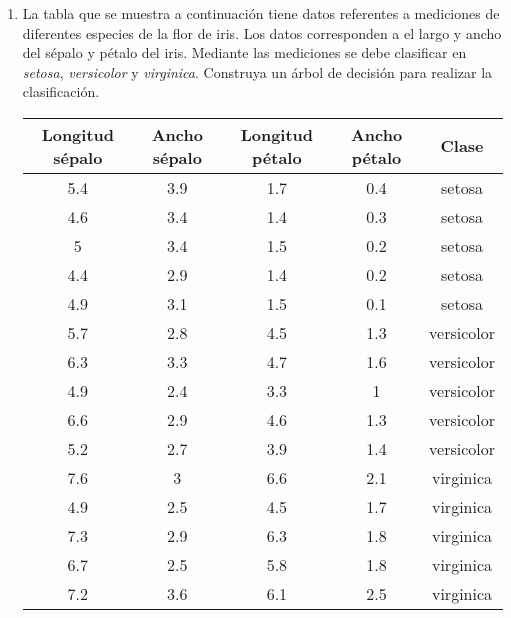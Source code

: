 \documentclass[
10pt, %
a4paper, %
]{article}
\begin{document}
\begin{enumerate}
    \item La tabla que se muestra a continuación tiene datos referentes a mediciones de diferentes especies de la flor de 
    iris\cite{scikit-learn}. Los datos corresponden a el largo y ancho del sépalo y pétalo del iris. Mediante las mediciones se debe
	clasificar en \textit{setosa}, \textit{versicolor} y \textit{virginica}. Construya un árbol de decisión para realizar
	la clasificación.
         \begin{table}[H]
                 \centering
                 \begin{tabular}{ccccc}
                         \toprule
                         Longitud sépalo & Ancho sépalo & Longitud pétalo & Ancho pétalo & Clase \\ \midrule
                         5.4 & 3.9 & 1.7 & 0.4 & setosa \\
                         4.6 & 3.4 & 1.4 & 0.3 & setosa \\
                         5   & 3.4 & 1.5 & 0.2 & setosa \\
                         4.4 & 2.9 & 1.4 & 0.2 & setosa \\
                         4.9 & 3.1 & 1.5 & 0.1 & setosa \\
                         5.7 & 2.8 & 4.5 & 1.3 & versicolor \\
                         6.3 & 3.3 & 4.7 & 1.6 & versicolor \\
                         4.9 & 2.4 & 3.3 & 1   & versicolor \\
                         6.6 & 2.9 & 4.6 & 1.3 & versicolor \\
                         5.2 & 2.7 & 3.9 & 1.4 & versicolor \\
                         7.6 & 3   & 6.6 & 2.1 & virginica \\
                         4.9 & 2.5 & 4.5 & 1.7 & virginica \\
                         7.3 & 2.9 & 6.3 & 1.8 & virginica \\
                         6.7 & 2.5 & 5.8 & 1.8 & virginica \\
                         7.2 & 3.6 & 6.1 & 2.5 & virginica \\
                         \bottomrule
                 \end{tabular}
         \end{table}



\end{enumerate}
\end{document}

